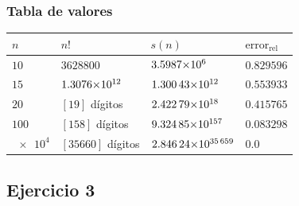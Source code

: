 \documentclass[12pt]{beamer}
\begin{document}
\begin{frame}
\frametitle{Tabla de valores}
\begin{table}[H]
\centering
\begin{tabular}{l l l l}
$n$ & $n!$ & $s(n)$ & $\mbox{error}_{\mbox{rel}}$ \\ \hline
$10$ & $3628800$ & $\num[tight-spacing=true]{3.5987d6}$ & $0.829596$ \\ \hline \pause
$15$ & $\num[tight-spacing=true]{1.3076d12}$ & $\num[tight-spacing=true]{1.30043d12}$ & $0.553933$ \\ \hline \pause
$20$ & $[19]$ dígitos & $\num[tight-spacing=true]{2.42279d18}$ & $0.415765$ \\ \hline \pause
$100$ & $[158]$ dígitos & $\num[tight-spacing=true]{9.32485d157}$ & $0.083298$ \\ \hline \pause
$\num{e4}$ & $[35660]$ dígitos & $\num[tight-spacing=true]{2.84624d35659}$ & $0.0$ \\ \hline
\end{tabular}
\end{table}
\end{frame}

\subsection{Ejercicio 3}
\end{document}
